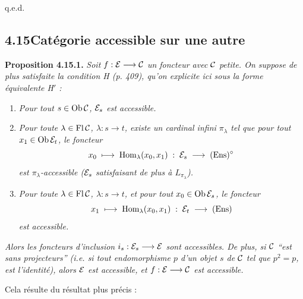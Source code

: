 \hfill q.e.d.


\subsection*{4.15\quad Catégorie accessible sur une autre}

\textbf{Proposition 4.15.1.} \textit{Soit $f : \mathcal{E} \longrightarrow \mathcal{C}$ un foncteur avec $\mathcal{C}$ petite. On suppose de plus satisfaite la condition H (p. 409), qu'on explicite ici sous la forme équivalente H$'$ :}
\begin{enumerate}
\item[\textit{H 1)}] \textit{Pour tout $s \in \operatorname{Ob}\mathcal{C}$, $\mathcal{E}_s$ est accessible.}
\item[\textit{H 2)}] \textit{Pour toute $\lambda \in \operatorname{Fl}\mathcal{C}$, $\lambda : s \longrightarrow t$, existe un cardinal infini $\pi_\lambda$ tel que pour tout $x_1 \in \operatorname{Ob}\mathcal{E}_t$, le foncteur}
\[
x_0 \;\longmapsto\; \operatorname{Hom}_\lambda(x_0,x_1) \;:\; \mathcal{E}_s \;\longrightarrow\; (\mathrm{Ens})^\circ
\]
\textit{est $\pi_\lambda$-accessible ($\mathcal{E}_s$ satisfaisant de plus à $L_{\pi_\lambda}$).}
\item[\textit{H 3)}] \textit{Pour toute $\lambda \in \operatorname{Fl}\mathcal{C}$, $\lambda : s \longrightarrow t$, et pour tout $x_0 \in \operatorname{Ob}\mathcal{E}_s$, le foncteur}
\[
x_1 \;\longmapsto\; \operatorname{Hom}_\lambda(x_0,x_1) \;:\; \mathcal{E}_t \;\longrightarrow\; (\mathrm{Ens})
\]
\textit{est accessible.}
\end{enumerate}
\textit{Alors les foncteurs d'inclusion $i_s : \mathcal{E}_s \longrightarrow \mathcal{E}$ sont accessibles. De plus, si $\mathcal{C}$ ``est sans projecteurs'' (i.e. si tout endomorphisme $p$ d'un objet $s$ de $\mathcal{C}$ tel que $p^2 = p$, est l'identité), alors $\mathcal{E}$ est accessible, et $f : \mathcal{E} \longrightarrow \mathcal{C}$ est accessible.}

Cela résulte du résultat plus précis :

